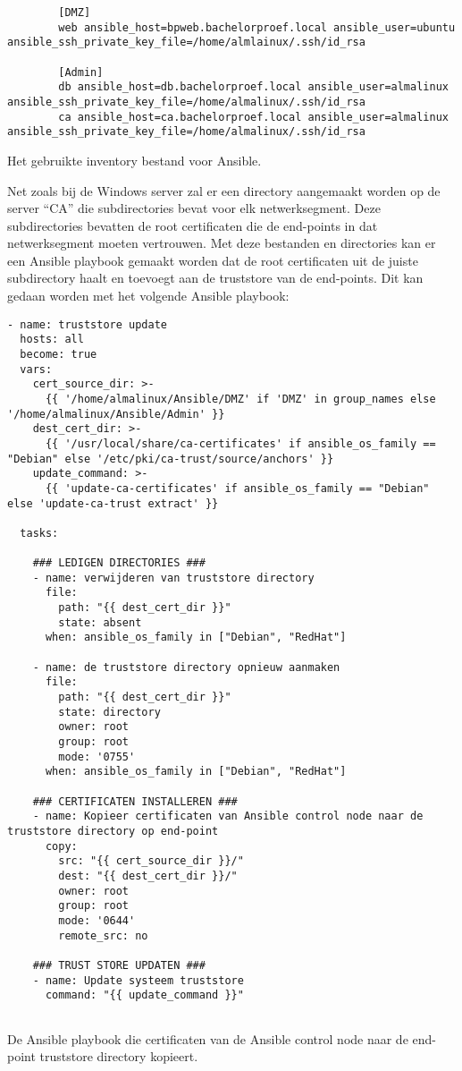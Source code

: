 \begin{listing}[H]
    \begin{verbatim}
        [DMZ]
        web ansible_host=bpweb.bachelorproef.local ansible_user=ubuntu ansible_ssh_private_key_file=/home/almlainux/.ssh/id_rsa

        [Admin]
        db ansible_host=db.bachelorproef.local ansible_user=almalinux ansible_ssh_private_key_file=/home/almalinux/.ssh/id_rsa
        ca ansible_host=ca.bachelorproef.local ansible_user=almalinux ansible_ssh_private_key_file=/home/almalinux/.ssh/id_rsa
    \end{verbatim}
    \caption[Inventory file voor Ansible]{Het gebruikte inventory bestand voor Ansible.}
\end{listing}

Net zoals bij de Windows server zal er een directory aangemaakt worden op de server ``CA'' die subdirectories bevat voor elk netwerksegment. Deze subdirectories bevatten de root certificaten die de end-points in dat netwerksegment moeten vertrouwen.
Met deze bestanden en directories kan er een Ansible playbook gemaakt worden dat de root certificaten uit de juiste subdirectory haalt en toevoegt aan de truststore van de end-points. Dit kan gedaan worden met het volgende Ansible playbook:
\begin{listing}[H]
\begin{verbatim}
- name: truststore update
  hosts: all
  become: true
  vars:
    cert_source_dir: >-
      {{ '/home/almalinux/Ansible/DMZ' if 'DMZ' in group_names else '/home/almalinux/Ansible/Admin' }}
    dest_cert_dir: >-
      {{ '/usr/local/share/ca-certificates' if ansible_os_family == "Debian" else '/etc/pki/ca-trust/source/anchors' }}
    update_command: >-
      {{ 'update-ca-certificates' if ansible_os_family == "Debian" else 'update-ca-trust extract' }}

  tasks:

    ### LEDIGEN DIRECTORIES ###
    - name: verwijderen van truststore directory
      file:
        path: "{{ dest_cert_dir }}"
        state: absent
      when: ansible_os_family in ["Debian", "RedHat"]

    - name: de truststore directory opnieuw aanmaken
      file:
        path: "{{ dest_cert_dir }}"
        state: directory
        owner: root
        group: root
        mode: '0755'
      when: ansible_os_family in ["Debian", "RedHat"]

    ### CERTIFICATEN INSTALLEREN ###
    - name: Kopieer certificaten van Ansible control node naar de truststore directory op end-point
      copy:
        src: "{{ cert_source_dir }}/"
        dest: "{{ dest_cert_dir }}/"
        owner: root
        group: root
        mode: '0644'
        remote_src: no

    ### TRUST STORE UPDATEN ###
    - name: Update systeem truststore
      command: "{{ update_command }}"


\end{verbatim}
\caption[Ansible playbook]{De Ansible playbook die certificaten van de Ansible control node naar de end-point truststore directory kopieert.}
\end{listing}

